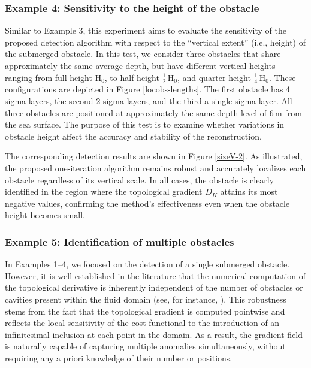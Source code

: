 \documentclass[a4paper,12pt,reqno,natbib]{amsart}
\begin{document}
\subsubsection{Example 4: Sensitivity to the height of the obstacle} \label{size}

Similar to Example 3, this experiment aims to evaluate the sensitivity of the proposed detection algorithm with respect to the ``vertical extent'' (i.e., height) of the submerged obstacle. In this test, we consider three obstacles that share approximately the same average depth, but have different vertical heights—ranging from full height \( \mathrm{H}_0 \), to half height \(\displaystyle \frac{1}{2}\,\mathrm{H}_0 \), and quarter height \( \displaystyle\frac{1}{4}\,\mathrm{H}_0 \). These configurations are depicted in Figure \ref{locobs-lengths}. The first obstacle has 4 sigma layers, the second 2 sigma layers, and the third a single sigma layer. All three obstacles are positioned at approximately the same depth level of 6\,m from the sea surface. The purpose of this test is to examine whether variations in obstacle height affect the accuracy and stability of the reconstruction.





The corresponding detection results are shown in Figure \ref{sizeV-2}. As illustrated, the proposed one-iteration algorithm remains robust and accurately localizes each obstacle regardless of its vertical scale. In all cases, the obstacle is clearly identified in the region where the topological gradient \( D_K \) attains its most negative values, confirming the method’s effectiveness even when the obstacle height becomes small.




\subsubsection{Example 5: Identification of multiple obstacles}

In Examples 1--4, we focused on the detection of a single submerged obstacle. However, it is well established in the literature that the numerical computation of the topological derivative is inherently independent of the number of obstacles or cavities present within the fluid domain (see, for instance, \cite{BenAbdaSIAM2009,CaubetIPI2016,CaubetIP2012}). This robustness stems from the fact that the topological gradient is computed pointwise and reflects the local sensitivity of the cost functional to the introduction of an infinitesimal inclusion at each point in the domain. As a result, the gradient field is naturally capable of capturing multiple anomalies simultaneously, without requiring any a priori knowledge of their number or positions.
\end{document}
